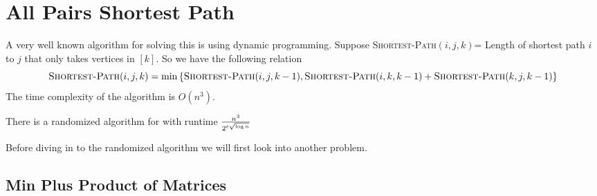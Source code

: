 \section{All Pairs Shortest Path}
\begin{algoprob}
\end{algoprob}

A very well known algorithm for solving this is  using dynamic programming.  Suppose \textsc{Shortest-Path}$(i,j,k)$= Length of shortest path $i$ to $j$ that only takes vertices in $[k]$. So we have the following relation $$\textsc{Shortest-Path}(i,j,k)=\min\left\{  \textsc{Shortest-Path}(i,j,k-1), \textsc{Shortest-Path}(i,k,k-1)+\textsc{Shortest-Path}(k,j,k-1)  \right\}$$The time complexity of the algorithm is $O(n^3)$.

\begin{Theorem}{\cite{Williams_2014_Fap_CONF}}{}
	There is a randomized algorithm for  with runtime $\frac{n^3}{2^{\epsilon\sqrt{\log n}}}$
\end{Theorem}
 Before diving in to the randomized algorithm we will first look into another problem.


\subsection{Min Plus Product of Matrices}
